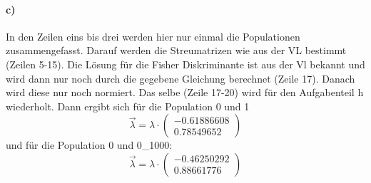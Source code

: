 \paragraph{c)} \quad \newline

In den Zeilen eins bis drei werden hier nur einmal die Populationen zusammengefasst. Darauf werden
die Streumatrizen wie aus der VL bestimmt (Zeilen 5-15). Die Lösung für die Fisher Diskriminante
ist aus der Vl bekannt und wird dann nur noch durch die gegebene Gleichung berechnet (Zeile 17).
Danach wird diese nur noch normiert. Das selbe (Zeile 17-20) wird für den Aufgabenteil h wiederholt.
Dann ergibt sich für die Population 0 und 1
\begin{equation}
\vec{\lambda} = \lambda \cdot
\begin{pmatrix}
-0.61886608\\
0.78549652
\end{pmatrix}
\end{equation}
und für die Population 0 und 0\_1000:
\begin{equation}
\vec{\lambda} = \lambda \cdot
\begin{pmatrix}
-0.46250292 \\
0.88661776
\end{pmatrix}
\end{equation}
